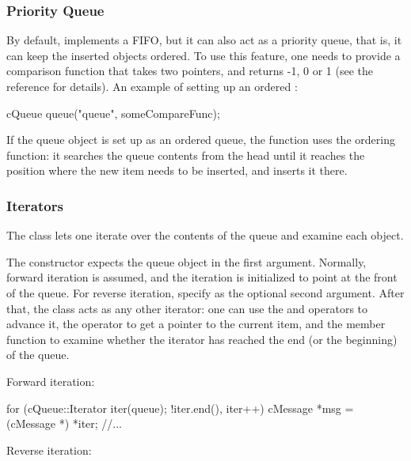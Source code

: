 \subsubsection{Priority Queue}
\label{sec:sim-lib:cqueue-as-priority-queue}

By default,  implements a FIFO, but it can also act as a
priority queue, that is, it can keep the inserted objects
ordered.  To use this feature, one needs to provide a
comparison function that takes two  pointers, and returns
-1, 0 or 1 (see the reference for details).  An example of setting up an
ordered :

\begin{cpp}
cQueue queue("queue", someCompareFunc);
\end{cpp}

If the queue object is set up as an ordered queue, the 
function uses the ordering function: it searches the queue contents
from the head until it reaches the position where the new item
needs to be inserted, and inserts it there.


\subsubsection{Iterators}
\label{sec:sim-lib:cqueue-iteration}

The  class lets one iterate over the contents
of the queue and examine each object.

The  constructor expects the queue object in the
first argument. Normally, forward iteration is assumed, and the iteration
is initialized to point at the front of the queue. For reverse iteration,
specify  as the optional second argument. After that, the
class acts as any other {\opp} iterator: one can use the \ttt{++} and
\ttt{--} operators to advance it, the \ttt{*} operator to get a pointer
to the current item, and the  member function to examine
whether the iterator has reached the end (or the beginning) of the queue.

Forward iteration:

\begin{cpp}
for (cQueue::Iterator iter(queue); !iter.end(), iter++) {
    cMessage *msg = (cMessage *) *iter;
    //...
}
\end{cpp}

Reverse iteration:

